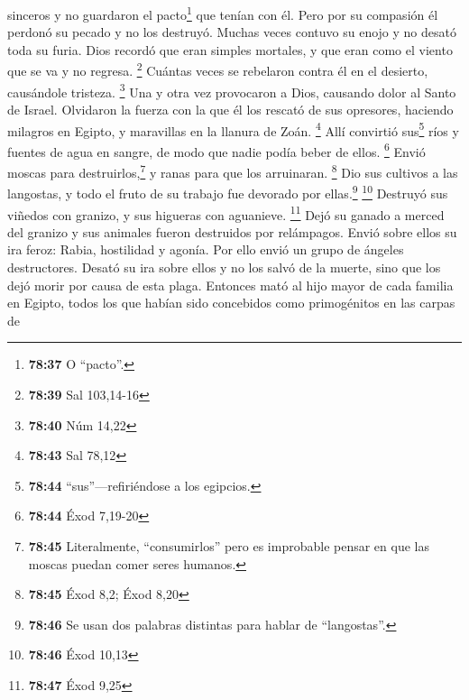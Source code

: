 sinceros y no guardaron el pacto\footnote{\textbf{78:37} O ``pacto''.}
que tenían con él.  Pero por su compasión él perdonó su
pecado y no los destruyó. Muchas veces contuvo su enojo y no desató toda
su furia.  Dios recordó que eran simples mortales, y que
eran como el viento que se va y no regresa. \footnote{\textbf{78:39} Sal
  103,14-16}  Cuántas veces se rebelaron contra él en el
desierto, causándole tristeza. \footnote{\textbf{78:40} Núm 14,22}
 Una y otra vez provocaron a Dios, causando dolor al
Santo de Israel.  Olvidaron la fuerza con la que él los
rescató de sus opresores,  haciendo milagros en Egipto, y
maravillas en la llanura de Zoán. \footnote{\textbf{78:43} Sal 78,12}
 Allí convirtió sus\footnote{\textbf{78:44}
  ``sus''---refiriéndose a los egipcios.} ríos y fuentes de agua en
sangre, de modo que nadie podía beber de ellos. \footnote{\textbf{78:44}
  Éxod 7,19-20}  Envió moscas para
destruirlos,\footnote{\textbf{78:45} Literalmente, ``consumirlos'' pero
  es improbable pensar en que las moscas puedan comer seres humanos.} y
ranas para que los arruinaran. \footnote{\textbf{78:45} Éxod 8,2; Éxod
  8,20}  Dio sus cultivos a las langostas, y todo el
fruto de su trabajo fue devorado por ellas.\footnote{\textbf{78:46} Se
  usan dos palabras distintas para hablar de ``langostas''.} \footnote{\textbf{78:46}
  Éxod 10,13}  Destruyó sus viñedos con granizo, y sus
higueras con aguanieve. \footnote{\textbf{78:47} Éxod 9,25}
 Dejó su ganado a merced del granizo y sus animales
fueron destruidos por relámpagos.  Envió sobre ellos su
ira feroz: Rabia, hostilidad y agonía. Por ello envió un grupo de
ángeles destructores.  Desató su ira sobre ellos y no los
salvó de la muerte, sino que los dejó morir por causa de esta plaga.
 Entonces mató al hijo mayor de cada familia en Egipto,
todos los que habían sido concebidos como primogénitos en las carpas de
